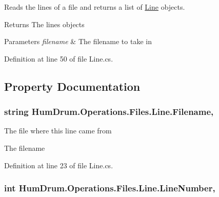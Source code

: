 Reads the lines of a file and returns a list of \hyperlink{classHumDrum_1_1Operations_1_1Files_1_1Line}{Line} objects. 

\begin{DoxyReturn}{Returns}
The lines objects
\end{DoxyReturn}

\begin{DoxyParams}{Parameters}
{\em filename} & The filename to take in\\
\hline
\end{DoxyParams}


Definition at line 50 of file Line.\+cs.



\subsection{Property Documentation}
\subsubsection[{\texorpdfstring{Filename}{Filename}}]{\setlength{\rightskip}{0pt plus 5cm}string Hum\+Drum.\+Operations.\+Files.\+Line.\+Filename\hspace{0.3cm}{\ttfamily [get]}, {\ttfamily [set]}}\hypertarget{classHumDrum_1_1Operations_1_1Files_1_1Line_ac9436ae7b88a971f32d4011a7e523d26}{}\label{classHumDrum_1_1Operations_1_1Files_1_1Line_ac9436ae7b88a971f32d4011a7e523d26}


The file where this line came from 

The filename

Definition at line 23 of file Line.\+cs.

\subsubsection[{\texorpdfstring{Line\+Number}{LineNumber}}]{\setlength{\rightskip}{0pt plus 5cm}int Hum\+Drum.\+Operations.\+Files.\+Line.\+Line\+Number\hspace{0.3cm}{\ttfamily [get]}, {\ttfamily [set]}}\hypertarget{classHumDrum_1_1Operations_1_1Files_1_1Line_acb6f59b3bf5a85ebfb190f53d0cb7c3b}{}\label{classHumDrum_1_1Operations_1_1Files_1_1Line_acb6f59b3bf5a85ebfb190f53d0cb7c3b}


